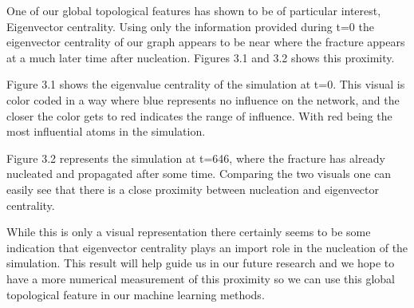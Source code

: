 One of our global topological features has shown to be of particular interest, Eigenvector centrality. Using only the information provided during t=0 the eigenvector centrality of our graph appears to be near where the fracture appears at a much later time after nucleation. Figures 3.1 and 3.2 shows this proximity. 

Figure 3.1 shows the eigenvalue centrality of the simulation at t=0. This visual is color coded in a way where blue represents no influence on the network, and the closer the color gets to red indicates the range of influence. With red being the most influential atoms in the simulation. 

Figure 3.2 represents the simulation at t=646,  where the fracture has already nucleated and propagated after some time. Comparing the two visuals one can easily see that there is a close proximity between nucleation and eigenvector centrality. 

While this is only a visual representation there certainly seems to be some indication that eigenvector centrality plays an import role in the nucleation of the simulation. This result will help guide us in our future research and we hope to have a more numerical measurement of this proximity so we can use this global topological feature in our machine learning methods. 

